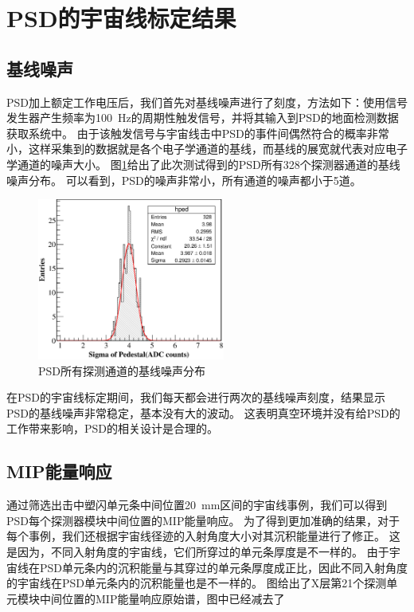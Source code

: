 \section{PSD的宇宙线标定结果}
\label{sec:cosmic_ray:results}
\subsection{基线噪声}
PSD加上额定工作电压后，我们首先对基线噪声进行了刻度，方法如下：使用信号发生器产生频率为\SI{100}{Hz}的周期性触发信号，并将其输入到PSD的地面检测数据获取系统中。
由于该触发信号与宇宙线击中PSD的事件间偶然符合的概率非常小，这样采集到的数据就是各个电子学通道的基线，而基线的展宽就代表对应电子学通道的噪声大小。
图\ref{fig:cosmic_ray:sigam_dist}给出了此次测试得到的PSD所有328个探测器通道的基线噪声分布。
可以看到，PSD的噪声非常小，所有通道的噪声都小于5道。
\begin{figure}[htbp]
	\centering
	\includegraphics[width=0.55\textwidth]{chap/cosmic_ray/fig/sigam_dist.eps}
	\caption{PSD所有探测通道的基线噪声分布}
	\label{fig:cosmic_ray:sigam_dist}
\end{figure}

在PSD的宇宙线标定期间，我们每天都会进行两次的基线噪声刻度，结果显示PSD的基线噪声非常稳定，基本没有大的波动。
这表明真空环境并没有给PSD的工作带来影响，PSD的相关设计是合理的。

\subsection{MIP能量响应}
通过筛选出击中塑闪单元条中间位置\SI{20}{mm}区间的宇宙线事例，我们可以得到PSD每个探测器模块中间位置的MIP能量响应。
为了得到更加准确的结果，对于每个事例，我们还根据宇宙线径迹的入射角度大小对其沉积能量进行了修正。
这是因为，不同入射角度的宇宙线，它们所穿过的单元条厚度是不一样的。
由于宇宙线在PSD单元条内的沉积能量与其穿过的单元条厚度成正比，因此不同入射角度的宇宙线在PSD单元条内的沉积能量也是不一样的。
图给出了X层第21个探测单元模块中间位置的MIP能量响应原始谱，图中已经减去了
















